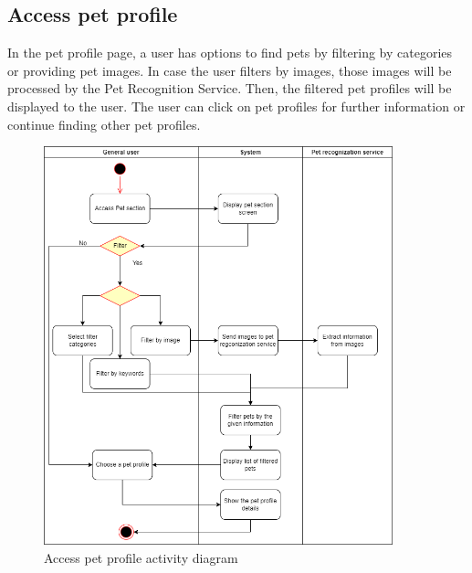 \subsection{Access pet profile}
In the pet profile page, a user has options to find pets by filtering by categories or providing pet images. In case the user filters by images, those images will be processed by the Pet Recognition Service. Then, the filtered pet profiles will be displayed to the user. The user can click on pet profiles for further information or continue finding other pet profiles.
\begin{figure}[H]
  \centering
  \includegraphics[width=0.9\textwidth]{Figures/access_pet.png}
  \caption{Access pet profile activity diagram}
  \label{fig:access-pet}
\end{figure}
\newpage

